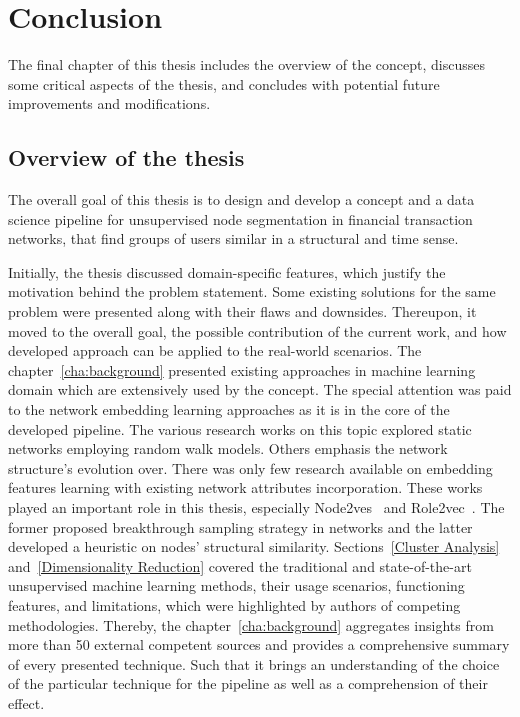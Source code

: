 \chapter{Conclusion}
\label{cha:conclusion}

The final chapter of this thesis includes the overview of the concept, discusses some critical aspects of the thesis, and concludes with potential future improvements and modifications.

\section{Overview of the thesis}

The overall goal of this thesis is to design and develop a concept and a data science pipeline for unsupervised node segmentation in financial transaction networks, that find groups of users similar in a structural and time sense.

Initially, the thesis discussed domain-specific features, which justify the motivation behind the problem statement. Some existing solutions for the same problem were presented along with their flaws and downsides. Thereupon, it moved to the overall goal, the possible contribution of the current work, and how developed approach can be applied to the real-world scenarios. The chapter~\ref{cha:background} presented existing approaches in machine learning domain which are extensively used by the concept. The special attention was paid to the network embedding learning approaches as it is in the core of the developed pipeline. The various research works on this topic explored static networks employing random walk models. Others emphasis the network structure's evolution over. There was only few research available on embedding features learning with existing network attributes incorporation. These works played an important role in this thesis, especially Node2ves~\cite{node2vec} and Role2vec~\cite{role2vec}. The former proposed breakthrough sampling strategy in networks and the latter developed a heuristic on nodes' structural similarity. Sections~\ref{Cluster Analysis} and~\ref{Dimensionality Reduction} covered the traditional and state-of-the-art unsupervised machine learning methods, their usage scenarios, functioning features, and limitations, which were highlighted by authors of competing methodologies. Thereby, the chapter~\ref{cha:background} aggregates insights from more than 50 external competent sources and provides a comprehensive summary of every presented technique. Such that it brings an understanding of the choice of the particular technique for the pipeline as well as a comprehension of their effect.

